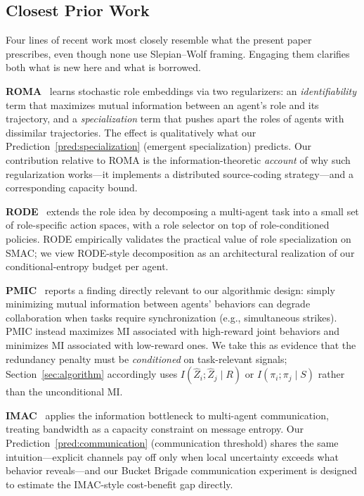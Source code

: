 \documentclass[10pt, letterpaper]{article}
\begin{document}
\subsection{Closest Prior Work}
\label{sec:closest-work}

Four lines of recent work most closely resemble what the present paper prescribes, even though none use Slepian--Wolf framing. Engaging them clarifies both what is new here and what is borrowed.

\textbf{ROMA}~\cite{wang2020roma} learns stochastic role embeddings via two regularizers: an \emph{identifiability} term that maximizes mutual information between an agent's role and its trajectory, and a \emph{specialization} term that pushes apart the roles of agents with dissimilar trajectories. The effect is qualitatively what our Prediction~\ref{pred:specialization} (emergent specialization) predicts. Our contribution relative to ROMA is the information-theoretic \emph{account} of why such regularization works---it implements a distributed source-coding strategy---and a corresponding capacity bound.

\textbf{RODE}~\cite{wang2021rode} extends the role idea by decomposing a multi-agent task into a small set of role-specific action spaces, with a role selector on top of role-conditioned policies. RODE empirically validates the practical value of role specialization on SMAC; we view RODE-style decomposition as an architectural realization of our conditional-entropy budget per agent.

\textbf{PMIC}~\cite{li2022pmic} reports a finding directly relevant to our algorithmic design: simply minimizing mutual information between agents' behaviors can degrade collaboration when tasks require synchronization (e.g., simultaneous strikes). PMIC instead maximizes MI associated with high-reward joint behaviors and minimizes MI associated with low-reward ones. We take this as evidence that the redundancy penalty must be \emph{conditioned} on task-relevant signals; Section~\ref{sec:algorithm} accordingly uses $I(\hat{Z}_i; \hat{Z}_j \mid R)$ or $I(\pi_i; \pi_j \mid S)$ rather than the unconditional MI.

\textbf{IMAC}~\cite{wang2020imac} applies the information bottleneck to multi-agent communication, treating bandwidth as a capacity constraint on message entropy. Our Prediction~\ref{pred:communication} (communication threshold) shares the same intuition---explicit channels pay off only when local uncertainty exceeds what behavior reveals---and our Bucket Brigade communication experiment is designed to estimate the IMAC-style cost-benefit gap directly.
\end{document}
